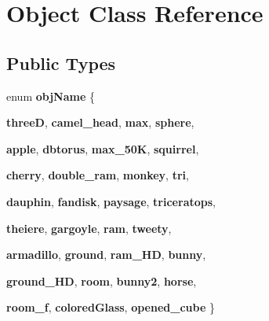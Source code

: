 \hypertarget{class_object}{
\section{Object Class Reference}
\label{class_object}
}
\subsection*{Public Types}
\begin{DoxyCompactItemize}
\item 
enum {\bfseries objName} \{ \par
{\bfseries threeD}, 
{\bfseries camel\_\-head}, 
{\bfseries max}, 
{\bfseries sphere}, 
\par
{\bfseries apple}, 
{\bfseries dbtorus}, 
{\bfseries max\_\-50K}, 
{\bfseries squirrel}, 
\par
{\bfseries cherry}, 
{\bfseries double\_\-ram}, 
{\bfseries monkey}, 
{\bfseries tri}, 
\par
{\bfseries dauphin}, 
{\bfseries fandisk}, 
{\bfseries paysage}, 
{\bfseries triceratops}, 
\par
{\bfseries theiere}, 
{\bfseries gargoyle}, 
{\bfseries ram}, 
{\bfseries tweety}, 
\par
{\bfseries armadillo}, 
{\bfseries ground}, 
{\bfseries ram\_\-HD}, 
{\bfseries bunny}, 
\par
{\bfseries ground\_\-HD}, 
{\bfseries room}, 
{\bfseries bunny2}, 
{\bfseries horse}, 
\par
{\bfseries room\_\-f}, 
{\bfseries coloredGlass}, 
{\bfseries opened\_\-cube}
 \}
\end{DoxyCompactItemize}
